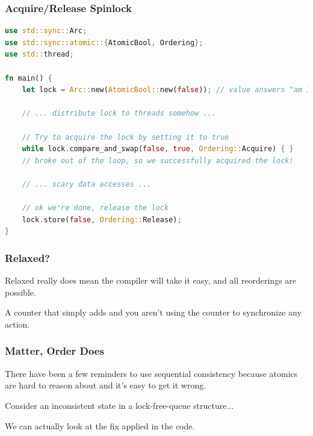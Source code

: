 \begin{frame}[fragile]
\frametitle{Acquire/Release Spinlock}

\begin{lstlisting}[language=Rust]
use std::sync::Arc;
use std::sync::atomic::{AtomicBool, Ordering};
use std::thread;

fn main() {
    let lock = Arc::new(AtomicBool::new(false)); // value answers "am I locked?"

    // ... distribute lock to threads somehow ...

    // Try to acquire the lock by setting it to true
    while lock.compare_and_swap(false, true, Ordering::Acquire) { }
    // broke out of the loop, so we successfully acquired the lock!

    // ... scary data accesses ...

    // ok we're done, release the lock
    lock.store(false, Ordering::Release);
}
\end{lstlisting}


\end{frame}


\begin{frame}
\frametitle{Relaxed?}

Relaxed really does mean the compiler will take it easy, and all reorderings are possible.

A counter that simply adds and you aren't using the counter to synchronize any action.

\end{frame}


\begin{frame}
\frametitle{Matter, Order Does}

There have been a few reminders to use sequential consistency because atomics are hard to reason about and it's easy to get it wrong.

Consider an inconsistent state in a lock-free-queue structure...

We can actually look at the fix applied in the code.

\end{frame}




